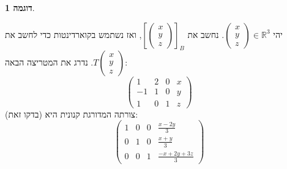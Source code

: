 \documentclass[12pt]{report}
\theoremstyle{plain}
\theoremstyle{definition}
\newtheorem{example}{דוגמה}[chapter]
\newcommand{\R}{\mathbb{R}}
\newcommand{\0}{\mathbf{0}}
\begin{document}
\begin{example}
\begin{enumerate}[label=\alph*.]
יהי
$\begin{pmatrix}x\\y\\z\end{pmatrix}\in\R^3$.
נחשב את
$\left[\begin{pmatrix}x\\y\\z\end{pmatrix}\right]_B$,
ואז נשתמש בקוארדינטות כדי לחשב את
$T\begin{pmatrix}x\\y\\z\end{pmatrix}$.
נדרג את המטריצה הבאה:
$$
\left(\begin{array}{ccc|c}
1 & 2 & 0 & x \\
-1 & 1 & 0 & y \\
1 & 0 & 1 & z
\end{array}\right)
$$
צורתה המדורגת קנונית היא (בדקו זאת): 
$$
\left(\begin{array}{ccc|c}
1 & 0 & 0 & \frac{x-2y}{3} \\
0 & 1 & 0 & \frac{x+y}{3} \\
0 & 0 & 1 & \frac{-x+2y+3z}{3}
\end{array}\right)
$$


\end{enumerate}
\end{example}
\end{document}
